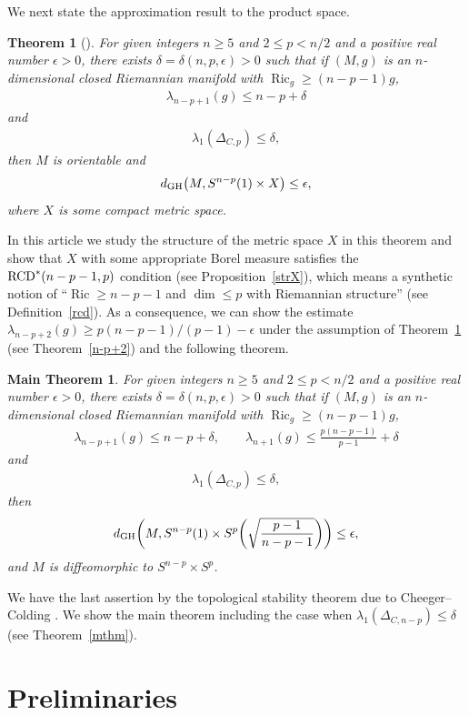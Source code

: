\documentclass[10pt,a4paper]{amsart}
\numberwithin{equation}{section}
\newtheorem{Thm}{Theorem}[section]
\newtheorem*{Ma}{Main Theorem}
\theoremstyle{definition}
\newcommand{\Ric}{\operatorname{Ric}}
\newcommand{\RCD}{{\rm RCD}^\ast}
\begin{document}
We next state the approximation result to the product space.
\begin{Thm}[\cite{Ai3}]\label{prevm}
For given integers $n\geq 5$ and $2\leq p < n/2$ and a positive real number $\epsilon>0$, there exists $\delta=\delta(n,p,\epsilon)>0$ such that if $(M,g)$ is an $n$-dimensional closed Riemannian manifold with $\Ric_g\geq (n-p-1)g$,
\begin{gather*}
\lambda_{n-p+1}(g)\leq n-p+\delta
\end{gather*}
and
\begin{gather*}
\lambda_1(\Delta_{C,p})\leq \delta,
\end{gather*}
then $M$ is orientable and
\[
d_{{\rm GH}}\big(M,S^{n-p}(1)\times X\big)\leq \epsilon,
\]
where $X$ is some compact metric space.
\end{Thm}

In this article we study the structure of the metric space $X$ in this theorem and show that $X$ with some appropriate Borel measure satisfies the $\RCD(n-p-1,p)$ condition (see Proposition~\ref{strX}), which means a synthetic notion of ``$\Ric\geq n-p-1$ and $\dim\leq p$ with Riemannian structure'' (see Definition~\ref{rcd}).
As a consequence, we can show the estimate $\lambda_{n-p+2}(g)\geq p(n-p-1)/(p-1)-\epsilon$ under the assumption of Theorem~\ref{prevm} (see Theorem~\ref{n-p+2}) and the following theorem.
\begin{Ma}
For given integers $n\geq 5$ and $2\leq p < n/2$ and a positive real number $\epsilon>0$, there exists $\delta=\delta(n,p,\epsilon)>0$ such that if $(M,g)$ is an $n$-dimensional closed Riemannian manifold with $\Ric_g\geq (n-p-1)g$,
\begin{gather*}
\lambda_{n-p+1}(g)\leq n-p+\delta,\qquad
\lambda_{n+1}(g)\leq \frac{p(n-p-1)}{p-1}+\delta
\end{gather*}
and
\begin{gather*}
\lambda_1(\Delta_{C,p})\leq \delta,
\end{gather*}
then
\[
d_{{\rm GH}}\bigg(M,S^{n-p}(1)\times S^p\bigg(\sqrt{\frac{p-1}{n-p-1}}\bigg)\bigg)\leq \epsilon,
\]
and $M$ is diffeomorphic to $S^{n-p}\times S^p$.
\end{Ma}
We have the last assertion by the topological stability theorem due to Cheeger--Colding \cite[Theorem~A.1.12]{CC1}.
We show the main theorem including the case when $\lambda_1(\Delta_{C,n-p})\leq \delta$ (see Theorem~\ref{mthm}).


\section{Preliminaries}
\end{document}

